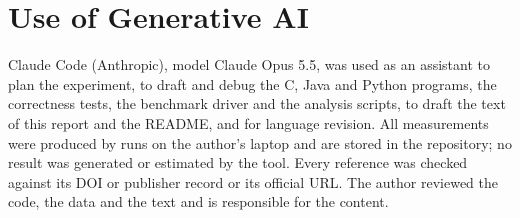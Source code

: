 \documentclass[conference,a4paper]{IEEEtran}
\begin{document}
\section*{Use of Generative AI}
Claude Code (Anthropic), model Claude Opus 5.5, was used as an assistant to plan the experiment, to draft and
debug the C, Java and Python programs, the correctness tests, the benchmark driver and the analysis scripts, to
draft the text of this report and the README, and for language revision. All measurements were produced by runs on
the author's laptop and are stored in the repository; no result was generated or estimated by the tool. Every
reference was checked against its DOI or publisher record or its official URL. The author reviewed the code, the
data and the text and is responsible for the content.



\end{document}
